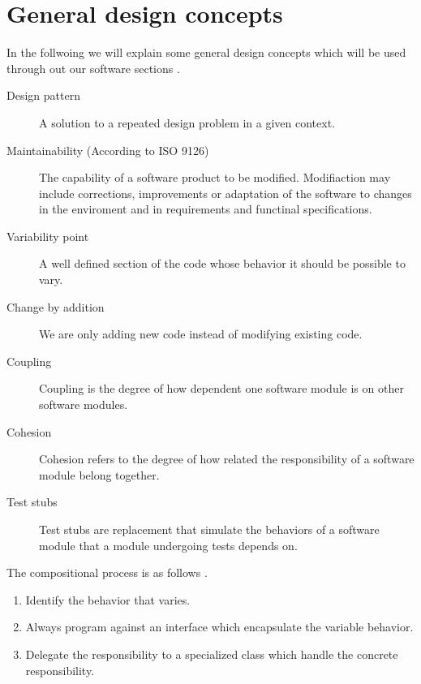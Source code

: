 \section{General design concepts}
In the follwoing we will explain some general design concepts which will be used through out our software sections \cite{Baerbak10}. 

\begin{description}
    \item[Design pattern] A solution to a repeated design problem in a given context.  
     \item[Maintainability (According to ISO 9126) ] The capability of a software product to be modified. Modifiaction may include corrections, improvements or adaptation of the software to changes in the enviroment and in requirements and functinal specifications.   
    \item[Variability point] A well defined section of the code whose behavior it should be possible to vary.  
    \item[Change by addition] We are only adding new code instead of modifying existing code. 
    \item[Coupling] Coupling is the degree of how dependent one software module is on other software modules. 
    \item[Cohesion] Cohesion refers to the degree of how related the responsibility of a software module belong together.    
   \item[Test stubs] Test stubs are replacement that simulate the behaviors of a software module that a module undergoing tests depends on.

\end{description}


\noindent
The compositional process is as follows \cite{Baerbak10}.


\begin{enumerate}
    \item Identify the behavior that varies. 

    \item Always program against an interface which encapsulate the variable behavior.
    
    \item Delegate the responsibility to a specialized class which handle the concrete responsibility.
\end{enumerate}